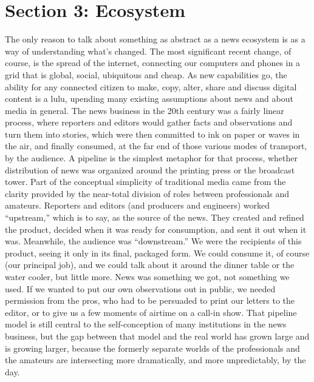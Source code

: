 \chapter{Section 3: Ecosystem}
The only reason to talk about something as abstract as a news ecosystem is as
a way of understanding what’s changed. The most significant recent change, of
course, is the spread of the internet, connecting our computers and phones in a
grid that is global, social, ubiquitous and cheap. As new capabilities go, the ability
for any connected citizen to make, copy, alter, share and discuss digital content is a
lulu, upending many existing assumptions about news and about media in general.
The news business in the 20th century was a fairly linear process, where reporters
and editors would gather facts and observations and turn them into stories,
which were then committed to ink on paper or waves in the air, and finally
consumed, at the far end of those various modes of transport, by the audience.
A pipeline is the simplest metaphor for that process, whether distribution of
news was organized around the printing press or the broadcast tower. Part of the
conceptual simplicity of traditional media came from the clarity provided by the
near-total division of roles between professionals and amateurs. Reporters and
editors (and producers and engineers) worked ``upstream,'' which is to say, as the
source of the news. They created and refined the product, decided when it was
ready for consumption, and sent it out when it was.
Meanwhile, the audience was ``downstream.'' We were the recipients of this product,
seeing it only in its final, packaged form. We could consume it, of course (our
principal job), and we could talk about it around the dinner table or the water
cooler, but little more. News was something we got, not something we used. If
we wanted to put our own observations out in public, we needed permission
from the pros, who had to be persuaded to print our letters to the editor, or to
give us a few moments of airtime on a call-in show.
That pipeline model is still central to the self-conception of many institutions in
the news business, but the gap between that model and the real world has grown
large and is growing larger, because the formerly separate worlds of the professionals
and the amateurs are intersecting more dramatically, and more unpredictably,
by the day.

